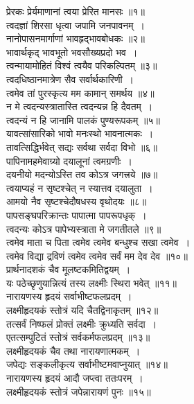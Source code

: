 \documentclass[twoside,top=1.7cm, bottom=1.7cm, outer=1cm,landscape, inner=1.5cm,a5paper,]{book}
\begin{document}
\begin{center}
प्रेरकः प्रेर्यमाणानां त्वया प्रेरित मानसः ॥१॥\\[10pt]
त्वदज्ञां शिरसा धृत्वा जपामि जनपावनम्~।\\
नानोपासनमार्गाणां भावहृद्भावबोधकः ॥२॥\\[10pt]
भावार्थकृद् भावभूतो भवसौख्यप्रदो भव~।\\
त्वन्मायामोहितं विश्वं त्वयैव परिकल्पितम् ॥३॥\\[10pt]
त्वदधिष्ठानमात्रेण सैव सर्वार्थकारिणी~।\\
त्वमेव तां पुरस्कृत्य मम कामान् समर्थय ॥४॥\\[10pt]
न मे त्वदन्यस्त्रातास्ति त्वदन्यन्न हि दैवतम्~।\\
त्वदन्यं न हि जानामि पालकं पुण्यरूपकम् ॥५॥\\[10pt]
यावत्सांसारिको भावो मनःस्थो भावनात्मकः~।\\
तावत्सिद्धिर्भवेत् सद्यः सर्वथा सर्वदा विभो ॥६॥\\[10pt]
पापिनामहमेवाग्र्यो दयालूनां त्वमग्रणीः~।\\
दयनीयो मदन्योऽस्ति तव कोऽत्र जगत्त्रये ॥७॥\\[10pt]
त्वयाप्यहं न सृष्टश्चेत् न स्यात्तव दयालुता~।\\
आमयो नैव सृष्टश्चेदौषधस्य वृथोदयः ॥८॥\\[10pt]
\newpage
पापसङ्घपरिक्रान्तः पापात्मा पापरूपधृक्~।\\
त्वदन्यः कोऽत्र पापेभ्यस्त्राता मे जगतीतले ॥९॥\\[10pt]
त्वमेव माता च पिता त्वमेव त्वमेव बन्धुश्च सखा त्वमेव~।\\
त्वमेव विद्या द्रविणं त्वमेव त्वमेव सर्वं मम देव देव ॥१०॥\\[10pt]
प्रार्थनादशकं चैव मूलष्टकमितिद्वयम्~।\\
यः पठेच्छृणुयान्नित्यं तस्य लक्ष्मीः स्थिरा भवेत् ॥११॥\\[10pt]
नारायणस्य हृदयं सर्वाभीष्टफलप्रदम्~।\\
लक्ष्मीहृदयकं स्तोत्रं यदि चैतद्विनाकृतम् ॥१२॥\\[10pt]
\newpage
तत्सर्वं निष्फलं प्रोक्तं लक्ष्मीः क्रुध्यति सर्वदा~।\\
एतत्सम्पुटितं स्तोत्रं सर्वकर्मफलप्रदम् ॥१३॥\\[10pt]
लक्ष्मीहृदयकं चैव तथा नारायणात्मकम्~।\\
जपेद्यः सङ्कलीकृत्य सर्वाभीष्टमवाप्नुयात् ॥१४॥\\[10pt]
नारायणस्य हृदयं आदौ जप्त्वा ततःपरम्~।\\
लक्ष्मीहृदयकं स्तोत्रं जपेन्नारायणं पुनः ॥१५॥\\[10pt]

\end{center}
\end{document}
